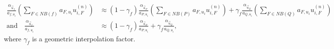   \begin{subequations}
    \label{eq:approxpwim}
  \begin{align}
    \frac{\alpha_{\vec{u}_f}}{a_{f,u_i}} \left(\sum_{F \in NB(f)} a_{F,u_i} u_{i,F}^{(n)} \right)
    &\approx
    \left(1-\gamma_f\right) \frac{\alpha_{\vec{u}_P}}{a_{P,u_i}} \left(\sum_{F \in NB(P)} a_{F,u_i} u_{i,F}^{(n)} \right)
    +
    \gamma_f \frac{\alpha_{\vec{u}_Q}}{a_{Q,u_i}} \left(\sum_{F \in NB(Q)} a_{F,u_i} u_{i,F}^{(n)} \right) \\[1em]
    \text{and} \quad
    \frac{\alpha_{\vec{u}_f}}{a_{f,u_i}} 
    &\approx
    \left(1-\gamma_f\right) \frac{\alpha_{\vec{u}_P}}{a_{P,u_i}} 
    +
    \gamma_f \frac{\alpha_{\vec{u}_Q}}{a_{Q,u_i}},
  \end{align}
  \end{subequations}
  where \(\gamma_f\) is a geometric interpolation factor. 

